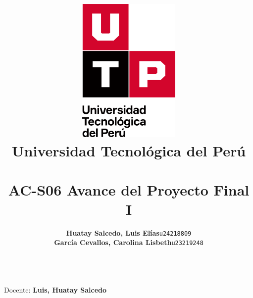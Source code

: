 \documentclass{article}
\title{
  \pagenumbering{gobble}
  \vspace{1cm}
  \includegraphics[width=5cm,clip,trim=0cm 2.9cm 0cm 0cm]{./assets/isotipo-utp.png} \\
  \vspace{0.5cm}
  \textbf{Universidad Tecnológica del Perú} \\
  \vspace{0.5cm}
  \text{Investigación Académica} \\
  \vspace{1cm}
    {\huge \textbf{AC-S06 Avance del Proyecto Final I}} \\
  \vspace{1cm}
}
\author{
  \begin{tabular}{l r}
    \textbf{Huatay Salcedo, Luis Elías} & \texttt{u24218809} \\
    \textbf{García Cevallos, Carolina Lisbeth} & \texttt{u23219248} \\
  \end{tabular} \\
}
\begin{document}
\maketitle
\begin{center}
  Docente: \textbf{Luis, Huatay Salcedo} \\
\end{center}

%
%

\newpage



\newpage
\setcounter{page}{1}  




\end{document}
